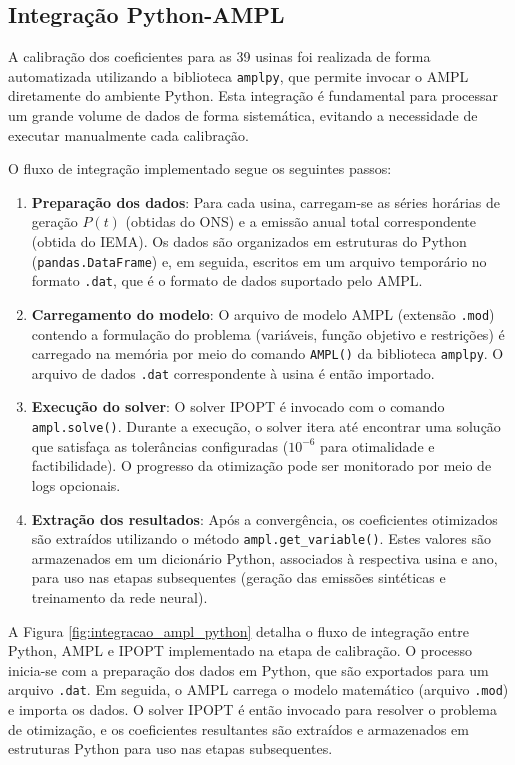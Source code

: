 \subsection{Integração Python-\ac{AMPL}}

A calibração dos coeficientes para as 39 usinas foi realizada de forma automatizada utilizando a biblioteca \texttt{amplpy}, que permite invocar o \ac{AMPL} diretamente do ambiente Python. Esta integração é fundamental para processar um grande volume de dados de forma sistemática, evitando a necessidade de executar manualmente cada calibração.

O fluxo de integração implementado segue os seguintes passos:

\begin{enumerate}
    \item \textbf{Preparação dos dados}: Para cada usina, carregam-se as séries horárias de geração \(P(t)\) (obtidas do \ac{ONS}) e a emissão anual total correspondente (obtida do \ac{IEMA}). Os dados são organizados em estruturas do Python (\texttt{pandas.DataFrame}) e, em seguida, escritos em um arquivo temporário no formato \texttt{.dat}, que é o formato de dados suportado pelo \ac{AMPL}.

    \item \textbf{Carregamento do modelo}: O arquivo de modelo \ac{AMPL} (extensão \texttt{.mod}) contendo a formulação do problema (variáveis, função objetivo e restrições) é carregado na memória por meio do comando \texttt{AMPL()} da biblioteca \texttt{amplpy}. O arquivo de dados \texttt{.dat} correspondente à usina é então importado.

    \item \textbf{Execução do solver}: O solver \ac{IPOPT} é invocado com o comando \texttt{ampl.solve()}. Durante a execução, o solver itera até encontrar uma solução que satisfaça as tolerâncias configuradas (\(10^{-6}\) para otimalidade e factibilidade). O progresso da otimização pode ser monitorado por meio de logs opcionais.

    \item \textbf{Extração dos resultados}: Após a convergência, os coeficientes otimizados são extraídos utilizando o método \texttt{ampl.get\_variable()}. Estes valores são armazenados em um dicionário Python, associados à respectiva usina e ano, para uso nas etapas subsequentes (geração das emissões sintéticas e treinamento da rede neural).
\end{enumerate}

A Figura \ref{fig:integracao_ampl_python} detalha o fluxo de integração entre Python, AMPL e IPOPT implementado na etapa de calibração. O processo inicia-se com a preparação dos dados em Python, que são exportados para um arquivo \texttt{.dat}. Em seguida, o AMPL carrega o modelo matemático (arquivo \texttt{.mod}) e importa os dados. O solver IPOPT é então invocado para resolver o problema de otimização, e os coeficientes resultantes são extraídos e armazenados em estruturas Python para uso nas etapas subsequentes.

